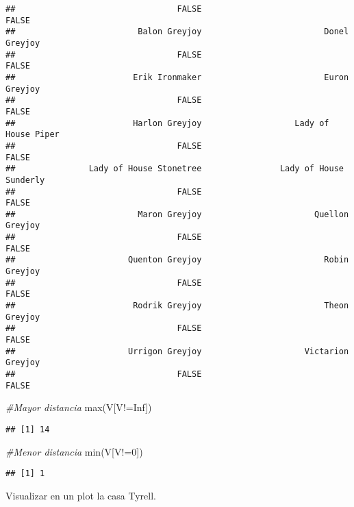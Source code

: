\documentclass[
]{book}
\newenvironment{Shaded}{\begin{snugshade}}{\end{snugshade}}
\newcommand{\CommentTok}[1]{\textcolor[rgb]{0.56,0.35,0.01}{\textit{#1}}}
\newcommand{\ConstantTok}[1]{\textcolor[rgb]{0.00,0.00,0.00}{#1}}
\newcommand{\DecValTok}[1]{\textcolor[rgb]{0.00,0.00,0.81}{#1}}
\newcommand{\FunctionTok}[1]{\textcolor[rgb]{0.00,0.00,0.00}{#1}}
\newcommand{\NormalTok}[1]{#1}
\newcommand{\SpecialCharTok}[1]{\textcolor[rgb]{0.00,0.00,0.00}{#1}}
\begin{document}
\begin{verbatim}
##                                 FALSE                                 FALSE 
##                         Balon Greyjoy                         Donel Greyjoy 
##                                 FALSE                                 FALSE 
##                        Erik Ironmaker                         Euron Greyjoy 
##                                 FALSE                                 FALSE 
##                        Harlon Greyjoy                   Lady of House Piper 
##                                 FALSE                                 FALSE 
##               Lady of House Stonetree                Lady of House Sunderly 
##                                 FALSE                                 FALSE 
##                         Maron Greyjoy                       Quellon Greyjoy 
##                                 FALSE                                 FALSE 
##                       Quenton Greyjoy                         Robin Greyjoy 
##                                 FALSE                                 FALSE 
##                        Rodrik Greyjoy                         Theon Greyjoy 
##                                 FALSE                                 FALSE 
##                       Urrigon Greyjoy                     Victarion Greyjoy 
##                                 FALSE                                 FALSE
\end{verbatim}

\begin{Shaded}
\begin{Highlighting}[]
\CommentTok{\#Mayor distancia}
\FunctionTok{max}\NormalTok{(V[V}\SpecialCharTok{!=}\ConstantTok{Inf}\NormalTok{])}
\end{Highlighting}
\end{Shaded}

\begin{verbatim}
## [1] 14
\end{verbatim}

\begin{Shaded}
\begin{Highlighting}[]
\CommentTok{\#Menor distancia}
\FunctionTok{min}\NormalTok{(V[V}\SpecialCharTok{!=}\DecValTok{0}\NormalTok{])}
\end{Highlighting}
\end{Shaded}

\begin{verbatim}
## [1] 1
\end{verbatim}

Visualizar en un plot la casa Tyrell.
\end{document}
